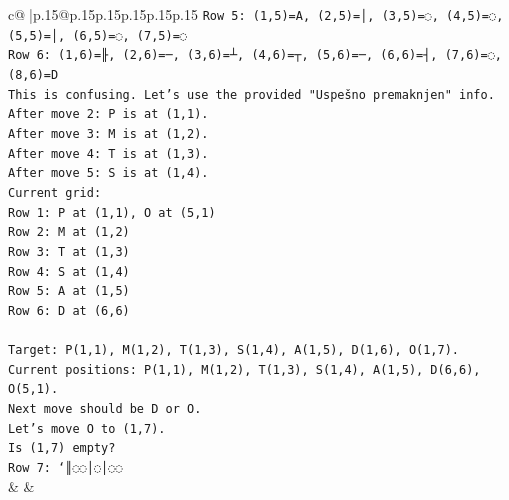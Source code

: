 \documentclass{article}
\begin{document}
{\begin{supertabular}{c@{$\;$}|p{.15\linewidth}@{}p{.15\linewidth}p{.15\linewidth}p{.15\linewidth}p{.15\linewidth}p{.15\linewidth}}
{{{\texttt{Row 5: (1,5)=A, (2,5)=│, (3,5)=◌, (4,5)=◌, (5,5)=│, (6,5)=◌, (7,5)=◌} \\
\texttt{Row 6: (1,6)=╟, (2,6)=─, (3,6)=┴, (4,6)=┬, (5,6)=─, (6,6)=┤, (7,6)=◌, (8,6)=D} \\
\texttt{This is confusing. Let's use the provided "Uspešno premaknjen" info.} \\
\texttt{After move 2: P is at (1,1).} \\
\texttt{After move 3: M is at (1,2).} \\
\texttt{After move 4: T is at (1,3).} \\
\texttt{After move 5: S is at (1,4).} \\
\texttt{Current grid:} \\
\texttt{Row 1: P at (1,1), O at (5,1)} \\
\texttt{Row 2: M at (1,2)} \\
\texttt{Row 3: T at (1,3)} \\
\texttt{Row 4: S at (1,4)} \\
\texttt{Row 5: A at (1,5)} \\
\texttt{Row 6: D at (6,6)} \\
\\ 
\texttt{Target: P(1,1), M(1,2), T(1,3), S(1,4), A(1,5), D(1,6), O(1,7).} \\
\texttt{Current positions: P(1,1), M(1,2), T(1,3), S(1,4), A(1,5), D(6,6), O(5,1).} \\
\texttt{Next move should be D or O.} \\
\texttt{Let's move O to (1,7).} \\
\texttt{Is (1,7) empty?} \\
\texttt{Row 7: `║◌◌│◌│◌◌} \\
            }
        }
    }
    & & \\ \\


\end{supertabular}}
\end{document}
